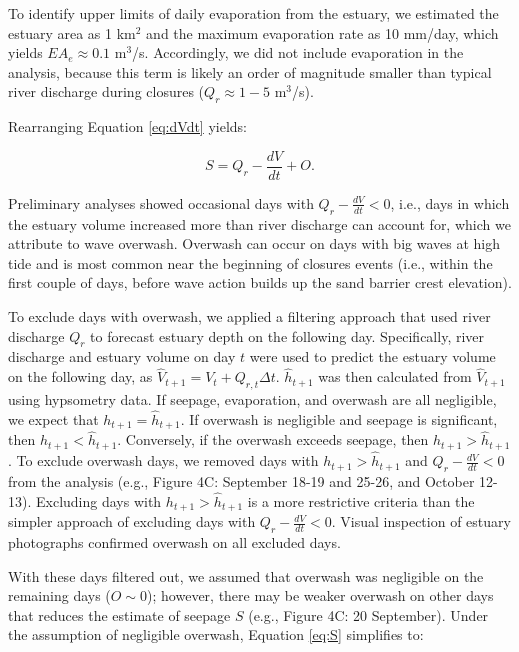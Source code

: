 \documentclass[preprint,12pt,authoryear]{elsarticle}
\begin{document}
To identify upper limits of daily evaporation from the estuary, we estimated the estuary area as 1 km$^2$ and the maximum  evaporation rate as 10 mm/day, which yields $E A_e \approx 0.1$ m$^3$/s. Accordingly, we did not include evaporation in the analysis, because this term is likely an order of magnitude smaller than typical river discharge during closures ($Q_r \approx 1-5$ m$^3$/s).

Rearranging Equation \ref{eq:dVdt} yields:

\begin{equation}
\label{eq:S}
    S  = Q_r - \frac{dV}{ dt} + O.
\end{equation}

Preliminary analyses showed occasional days with  $Q_r - \frac{dV}{ dt} <0$, i.e., days in which the estuary volume increased more than river discharge can account for, which we attribute to wave overwash. Overwash can occur on days with big waves at high tide and is most common near the beginning of closures events (i.e., within the first couple of days, before wave action builds up the sand barrier crest elevation).

To exclude days with overwash, we applied a filtering approach that used river discharge $Q_r$ to forecast estuary depth on the following day. 
Specifically, river discharge and  estuary volume  on day $t$ were used to predict the estuary volume on the following day,  as $\hat V_{t+1} = V_{t} + Q_{r,t} \Delta t$.    $\hat h_{t+1}$  was then calculated from $\hat V_{t+1}$ using hypsometry data.
If seepage, evaporation, and overwash are all negligible, we expect that $h_{t+1} = \hat h_{t+1}$. If overwash is negligible and seepage is significant, then $ h_{t+1} < \hat h_{t+1} $. Conversely, if  the overwash  exceeds seepage, then $h_{t+1} > \hat h_{t+1} $.  To exclude overwash days, we removed days with $h_{t+1} > \hat h_{t+1}$ and $Q_r - \frac{dV}{ dt} < 0$ from the analysis (e.g., Figure 4C: September 18-19 and 25-26, and October 12-13).
 Excluding days with  $ h_{t+1} > \hat h_{t+1}$ is a more restrictive criteria than the simpler approach of excluding days with $Q_r - \frac{dV}{ dt} < 0$.
Visual inspection of estuary photographs confirmed overwash on all excluded days. 

 With these days filtered out, we assumed that overwash was negligible on the remaining days ($O \sim 0$); however, there may be weaker overwash on other days that reduces the estimate of seepage $S$ (e.g., Figure 4C: 20 September). Under the assumption of negligible overwash, Equation \ref{eq:S} simplifies to:
\end{document}
